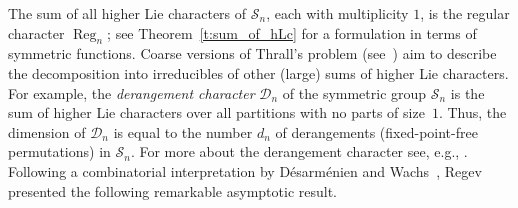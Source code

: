 \documentclass[12pt]%
{amsart}
\renewcommand\S{{\mathcal S}}
\DeclareMathOperator\Reg{Reg}
\theoremstyle{plain}
\theoremstyle{definition}
\theoremstyle{remark}
\newcommand{\todo}[1]{\vspace{5 mm}\par \noindent
	\marginpar{\textsc{ToDo}} \framebox{\begin{minipage}[c]{0.95
				\textwidth}
			#1 \end{minipage}}\vspace{5 mm}\par}
\begin{document}

  



 
The sum of all higher Lie characters of $\S_n$, each with multiplicity $1$, is the regular character $\Reg_n$; see Theorem~\ref{t:sum_of_hLc} for a formulation in terms of symmetric functions. 
Coarse versions of Thrall's problem (see~\cite{Reiner-Banff}) aim to describe the decomposition into irreducibles of other (large) sums of higher Lie characters.
For example, the {\em derangement character} ${\mathcal D}_n$ of the symmetric group $\S_n$  is the sum of higher Lie characters over all partitions with no parts of size~$1$. Thus, the dimension of ${\mathcal D}_n$ is equal to the number $d_n$ of derangements (fixed-point-free permutations) in $\S_n$. For more about the derangement character see, e.g., \cite{DesarmenienWachs, ReinerWebb, AAER}.
Following a combinatorial interpretation by D\'esarm\'enien and Wachs~\cite{DesarmenienWachs}, 
Regev~\cite{Regev99} presented the following remarkable asymptotic result. 

\end{document}
